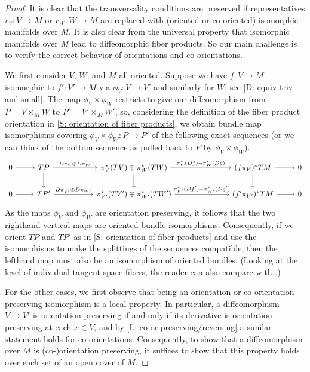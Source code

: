 \begin{proof}
	It is clear that the transversality conditions are preserved if representatives $r_V \colon V \to M$ or $r_W \colon W \to M$ are replaced with (oriented or co-oriented) isomorphic manifolds over $M$.
	It is also clear from the universal property that isomorphic manifolds over $M$ lead to diffeomorphic fiber products.
	So our main challenge is to verify the correct behavior of orientations and co-orientations.

	We first consider $V$, $W$, and $M$ all oriented.
	Suppose we have $f \colon V \to M$ isomorphic to $f' \colon V' \to M$ via $\phi_V \colon V \to V'$ and similarly for $W$; see \cref{D: equiv triv and small}.
	The map $\phi_V \times \phi_W$ restricts to give our diffeomorphism from $P = V \times_M W$ to $P' = V' \times_M W'$, so, considering the definition of the fiber product orientation in \cref{S: orientation of fiber products}, we obtain bundle map isomorphisms covering $\phi_V \times \phi_W \colon P \to P'$ of the following exact sequences (or we can think of the bottom sequence as pulled back to $P$ by $\phi_V \times \phi_W$).
	\begin{equation}
		\begin{tikzcd}
			0 \arrow[r] & TP \arrow[r,"D\pi_V \oplus D\pi_W"] \arrow[d] &[1cm] \pi_V^*(TV) \oplus \pi_W^*(TW) \arrow[r,"\pi_V^*(Df)-\pi_W^*(Dg)"] \arrow[d] &[1.7cm] (f\pi_V)^*TM \arrow[r] \arrow[d] & 0 \\
			0 \arrow[r] & TP' \arrow[r,"D\pi_{V'} \oplus D\pi_{W'}"] & \pi_{V'}^*(TV') \oplus \pi_{W'}^*(TW') \arrow[r,"\pi_{V'}^*(Df')-\pi_{W'}^*(Dg')"] & (f'\pi_{V'})^*TM \arrow[r] & 0
		\end{tikzcd}
	\end{equation}
	As the maps $\phi_V$ and $\phi_W$ are orientation preserving, it follows that the two righthand vertical maps are oriented bundle isomorphisms.
	Consequently, if we orient $TP$ and $TP'$ as in \cref{S: orientation of fiber products} and use the isomorphisms to make the splittings of the sequences compatible, then the lefthand map must also be an isomorphism of oriented bundles.
	(Looking at the level of individual tangent space fibers, the reader can also compare with \cite[Sections 9.1.1 and 9.3.1]{RamBas09}.)

	For the other cases, we first observe that being an orientation or co-orientation preserving isomorphism is a local property.
	In particular, a diffeomorphism $V \to V'$ is orientation preserving if and only if its derivative is orientation preserving at each $x \in V$, and by \cref{L: co-or preserving/reversing} a similar statement holds for co-orientations.
	Consequently, to show that a diffeomorphism over $M$ is (co-)orientation preserving, it suffices to show that this property holds over each set of an open cover of $M$.


\end{proof}
